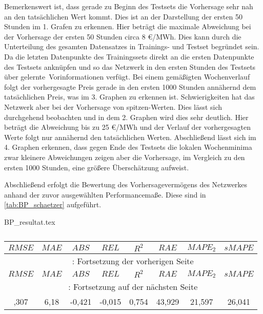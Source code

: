 Bemerkenswert ist, dass gerade zu Beginn des Testsets die Vorhersage sehr nah an den tatsächlichen Wert kommt. Dies ist an der Darstellung der ersten 50 Stunden im 1. Grafen zu erkennen. Hier beträgt die maximale Abweichung bei der Vorhersage der ersten 50 Stunden circa 8 €/MWh. Dies kann durch die Unterteilung des gesamten Datensatzes in Trainings- und Testset begründet sein. Da die letzten Datenpunkte des Trainingssets direkt an die ersten Datenpunkte des Testsets anknüpfen und so das Netzwerk in den ersten Stunden des Testsets über \glqq gelernte\grqq~Vorinformationen verfügt.
Bei einem gemäßigten Wochenverlauf folgt der vorhergesagte Preis gerade in den ersten 1000 Stunden annähernd dem tatsächlichen Preis, was im 3. Graphen zu erkennen ist. Schwierigkeiten hat das Netzwerk aber bei der Vorhersage von spitzen-Werten. Dies lässt sich durchgehend beobachten und in dem 2. Graphen wird dies sehr deutlich. Hier beträgt die Abweichung bis zu 25 €/MWh und der Verlauf der vorhergesagten Werte folgt nur annähernd den tatsächlichen Werten. Abschließend lässt sich im 4. Graphen erkennen, dass gegen Ende des Testsets die lokalen Wochenminima zwar kleinere Abweichungen zeigen aber die Vorhersage, im Vergleich zu den ersten 1000 Stunden, eine größere Überschätzung aufweist.

Abschließend erfolgt die Bewertung des Vorhersagevermögens des Netzwerkes anhand der zuvor ausgewählten Performancemaße. Diese sind in \autoref{tab:BP_schaetzer} aufgeführt.


\begin{filecontents*}{BP_resultat.tex}
{
\captionsetup{skip=1pt,margin=5pt,position=below} %

\begin{longtable}{cccccccc}
    \caption{} \label{tab:BP_schaetzer}\\
    \toprule
    \hiderowcolors
        $RMSE$ & $MAE$ & $ABS$ & $REL$ & $R^2$ & $RAE$ & $MAPE_2$ & $sMAPE$ \\
    \midrule
    \endfirsthead
        \multicolumn{8}{c}{\footnotesize \tablename\ \thetable{}: Fortsetzung der vorherigen Seite} \\
    \toprule
        $RMSE$ & $MAE$ & $ABS$ & $REL$ & $R^2$ & $RAE$ & $MAPE_2$ & $sMAPE$ \\
    \midrule
    \endhead
    \midrule
        \multicolumn{8}{c}{{\footnotesize \tablename\ \thetable{}: Fortsetzung auf der nächsten Seite}} \\
    \bottomrule
    \endfoot
    \bottomrule
    \endlastfoot
    \showrowcolors
        8,307 & 6,18 & -0,421 & -0,015 & 0,754 & 43,929 & 21,597 & 26,041 \\
\end{longtable}

}
\end{filecontents*}

